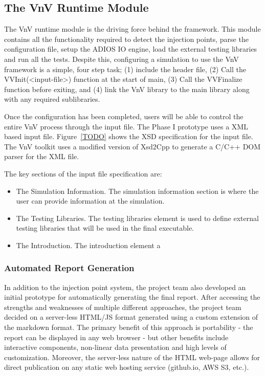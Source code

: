 \subsection{The VnV Runtime Module}

The VnV runtime module is the driving force behind the framework. This module contains all the functionality required  to detect the injection points, parse the
configuration file, setup the ADIOS IO engine, load the external testing libraries and run all the tests. Despite this, configuring a simulation to use the VnV 
framework is a simple, four step task; (1) include the header file, (2) Call the VVInit(<input-file>) function at the start of main, (3) Call the VVFinalize function
before exiting, and (4) link the VnV library to the main library along with any required sublibraries. 

Once the configuration has been completed, users will be able to control the entire VnV process through the input file. The Phase I prototype 
uses a XML based input file. Figure~\ref{TODO} shows the XSD specification for the input file. The VnV toolkit uses a  modified version of Xsd2Cpp to generate 
a C/C++ DOM parser for the XML file. 

The key sections of the input file specification are:
\begin{itemize}
 \item The Simulation Information. The simulation information section is where the user can provide information at the simulation. 
 \item The Testing Libraries. The testing libraries element is used to define external testing libraries that will be used in the final executable. 
 \item The Introduction. The introduction element a
\end{itemize}



\subsubsection{Automated Report Generation}

In addition to the injection point system, the project team also developed an initial prototype for automatically generating
the final report. After accessing the strengths and weaknesses of multiple different approaches, the project team
decided on a server-less HTML/JS format generated using a custom extension of the markdown format. The primary benefit of this approach is portability - the report can be displayed in any web browser - but other benefits include interactive components, non-linear data presentation and high levels of customization. Moreover, the server-less nature of the HTML web-page allows for direct publication on any static web hosting service (github.io, AWS S3, etc.). 


